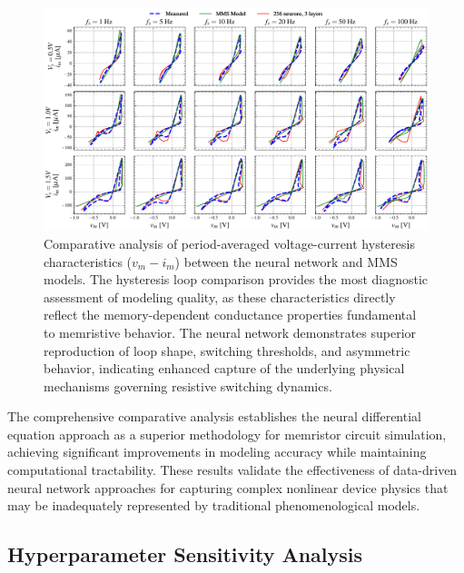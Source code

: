 \documentclass[11pt, oneside]{article}
\begin{document}
\begin{figure}[htbp!]
    \centering
    \includegraphics[width=\linewidth]{mms_results/simulated_histeresis.pdf}
    \caption{Comparative analysis of period-averaged voltage-current hysteresis characteristics ($v_m - i_m$) between the neural network and MMS models. The hysteresis loop comparison provides the most diagnostic assessment of modeling quality, as these characteristics directly reflect the memory-dependent conductance properties fundamental to memristive behavior. The neural network demonstrates superior reproduction of loop shape, switching thresholds, and asymmetric behavior, indicating enhanced capture of the underlying physical mechanisms governing resistive switching dynamics.}
    \label{fig:mms_histeresis}
\end{figure}

The comprehensive comparative analysis establishes the neural differential equation approach as a superior methodology for memristor circuit simulation, achieving significant improvements in modeling accuracy while maintaining computational tractability. These results validate the effectiveness of data-driven neural network approaches for capturing complex nonlinear device physics that may be inadequately represented by traditional phenomenological models.

\subsection{Hyperparameter Sensitivity Analysis}

\clearpage
\printbibliography[heading=bibintoc]
\end{document}
